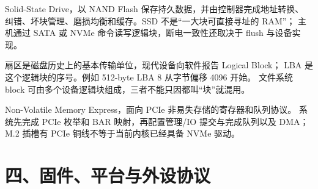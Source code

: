 \begin{description}[style=nextline,leftmargin=2.8em,labelindent=0em]
  \item[SSD]
  Solid-State Drive，以 NAND Flash 保存持久数据，并由控制器完成地址转换、
  纠错、坏块管理、磨损均衡和缓存。SSD 不是“一大块可直接寻址的 RAM”；
  主机通过 SATA 或 NVMe 命令读写逻辑块，断电一致性还取决于 flush 与设备实现。

  \item[扇区 / 逻辑块 / LBA]
  扇区是磁盘历史上的基本传输单位，现代设备向软件报告 Logical Block；
  LBA 是这个逻辑块的序号。例如 512-byte LBA 8 从字节偏移 4096 开始。
  文件系统 block 可由多个设备逻辑块组成，三者不能只因都叫“块”就混用。

  \item[NVMe]
  Non-Volatile Memory Express，面向 PCIe 非易失存储的寄存器和队列协议。
  系统先完成 PCIe 枚举和 BAR 映射，再配置管理/IO 提交与完成队列以及 DMA；
  M.2 插槽有 PCIe 铜线不等于当前内核已经具备 NVMe 驱动。
\end{description}

\section*{四、固件、平台与外设协议}

